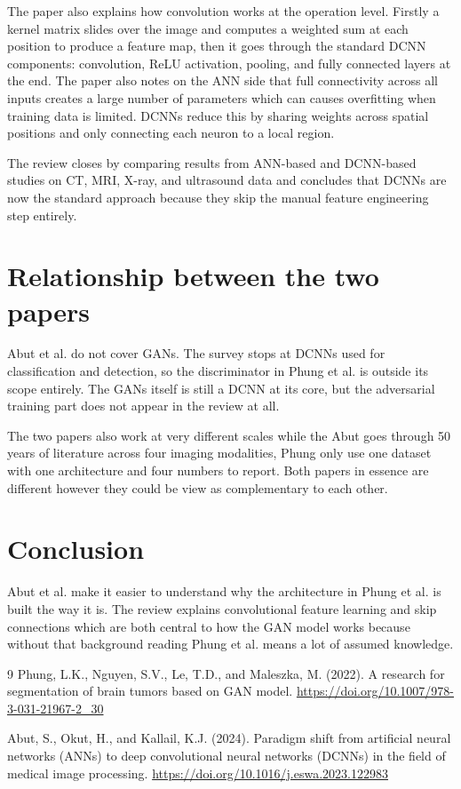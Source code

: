 \documentclass[12pt]{extreport}
\begin{document}
The paper also explains how convolution works at the operation level. Firstly a kernel matrix slides over the image and computes a weighted sum at each position to produce a feature map, then it goes through the standard DCNN components: convolution, ReLU activation, pooling, and fully connected layers at the end. The paper also notes on the ANN side that full connectivity across all inputs creates a large number of parameters which can causes overfitting when training data is limited. DCNNs reduce this by sharing weights across spatial positions and only connecting each neuron to a local region.

The review closes by comparing results from ANN-based and DCNN-based studies on CT, MRI, X-ray, and ultrasound data and concludes that DCNNs are now the standard approach because they skip the manual feature engineering step entirely.

\section{Relationship between the two papers}

Abut et al. \cite{paper2023} do not cover GANs. The survey stops at DCNNs used for classification and detection, so the discriminator in Phung et al. \cite{paper2022} is outside its scope entirely. The GANs itself is still a DCNN at its core, but the adversarial training part does not appear in the review at all.

The two papers also work at very different scales while the Abut goes through 50 years of literature across four imaging modalities, Phung only use one dataset with one architecture and four numbers to report. Both papers in essence are different however they could be view as complementary to each other.

\section{Conclusion}

Abut et al. \cite{paper2023} make it easier to understand why the architecture in Phung et al. \cite{paper2022} is built the way it is. The review explains convolutional feature learning and skip connections which are both central to how the GAN model works because without that background reading Phung et al. \cite{paper2022} means a lot of assumed knowledge.

\begin{thebibliography}{9}
Phung, L.K., Nguyen, S.V., Le, T.D., and Maleszka, M. (2022).
A research for segmentation of brain tumors based on GAN model.
\url{https://doi.org/10.1007/978-3-031-21967-2_30}

Abut, S., Okut, H., and Kallail, K.J. (2024).
Paradigm shift from artificial neural networks (ANNs) to deep convolutional neural networks (DCNNs) in the field of medical image processing.
\url{https://doi.org/10.1016/j.eswa.2023.122983}
\end{thebibliography}
\end{document}

